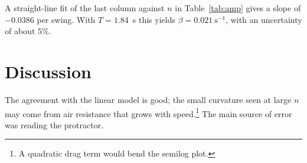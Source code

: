 \documentclass[10pt,a4paper]{article}
\begin{document}
A straight-line fit of the last column against $n$ in Table~\ref{tab:amp} gives a slope of $-0.0386$ per swing. With $T=1.84$~s this yields $\beta=0.021\ \mathrm{s}^{-1}$, with an uncertainty of about $5\%$.

\section{Discussion}
The agreement with the linear model is good; the small curvature seen at large $n$ may come from air resistance that grows with speed.\footnote{A quadratic drag term would bend the semilog plot.} The main source of error was reading the protractor.
\end{document}
